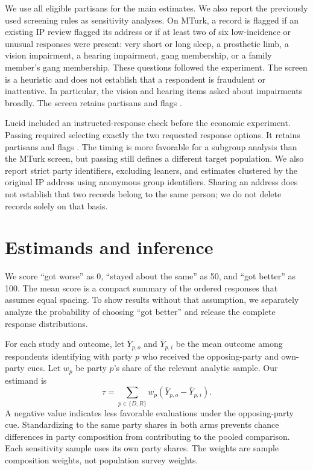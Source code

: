 \documentclass[11pt,letterpaper]{article}
\begin{document}
We use all eligible partisans for the main estimates. We also report the previously used screening rules as sensitivity analyses. On MTurk, a record is flagged if an existing IP review flagged its address or if at least two of six low-incidence or unusual responses were present: very short or long sleep, a prosthetic limb, a vision impairment, a hearing impairment, gang membership, or a family member's gang membership. These questions followed the experiment. The screen is a heuristic and does not establish that a respondent is fraudulent or inattentive. In particular, the vision and hearing items asked about impairments broadly. The screen retains \MTurkScreen{} partisans and flags \MTurkFlagged{}.

Lucid included an instructed-response check before the economic experiment. Passing required selecting exactly the two requested response options. It retains \LucidScreen{} partisans and flags \LucidFlagged{}. The timing is more favorable for a subgroup analysis than the MTurk screen, but passing still defines a different target population. We also report strict party identifiers, excluding leaners, and estimates clustered by the original IP address using anonymous group identifiers. Sharing an address does not establish that two records belong to the same person; we do not delete records solely on that basis.

\section{Estimands and inference}
We score ``got worse'' as 0, ``stayed about the same'' as 50, and ``got better'' as 100. The mean score is a compact summary of the ordered responses that assumes equal spacing. To show results without that assumption, we separately analyze the probability of choosing ``got better'' and release the complete response distributions.

For each study and outcome, let $\bar Y_{p,o}$ and $\bar Y_{p,i}$ be the mean outcome among respondents identifying with party $p$ who received the opposing-party and own-party cues. Let $w_p$ be party $p$'s share of the relevant analytic sample. Our estimand is
\[
\widehat\tau = \sum_{p\in\{D,R\}} w_p\left(\bar Y_{p,o}-\bar Y_{p,i}\right).
\]
A negative value indicates less favorable evaluations under the opposing-party cue. Standardizing to the same party shares in both arms prevents chance differences in party composition from contributing to the pooled comparison. Each sensitivity sample uses its own party shares. The weights are sample composition weights, not population survey weights.
\end{document}
